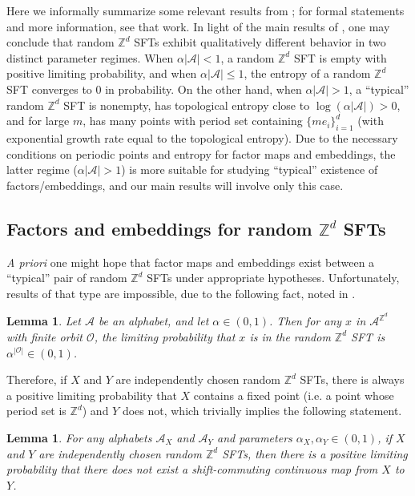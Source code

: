 \documentclass[12pt]{amsart}
\newtheorem{lemma}[theorem]{Lemma}
\theoremstyle{definition}
\begin{document}
Here we informally summarize some relevant results from \cite{McGoffPavlov}; for formal statements and more information, see that work. In light of the main results of \cite{McGoffPavlov}, one may conclude that random $\mathbb{Z}^d$ SFTs exhibit qualitatively different behavior in two distinct parameter regimes. When $\alpha |\mathcal{A}| < 1$, a random $\mathbb{Z}^d$ SFT is empty with positive limiting probability, and when $\alpha |\mathcal{A}| \leq 1$, the entropy of a random $\mathbb{Z}^d$ SFT converges to $0$ in probability. On the other hand, when $\alpha |\mathcal{A}| > 1$, a ``typical'' random $\mathbb{Z}^d$ SFT is nonempty, has topological entropy close to $\log(\alpha |\mathcal{A}|) > 0$, and for large $m$, has many points with period set containing $\{me_i\}_{i=1}^d$ (with exponential growth rate equal to the topological entropy). Due to the necessary conditions on periodic points and entropy for factor maps and embeddings, the latter regime ($\alpha |\mathcal{A}| >1$) is more suitable for studying ``typical'' existence of factors/embeddings, and our main results will involve only this case.

\subsection{Factors and embeddings for random $\mathbb{Z}^d$ SFTs} \label{Sect:MainResults}

\textit{A priori} one might hope that factor maps and embeddings exist between a ``typical'' pair of random $\mathbb{Z}^d$ SFTs under appropriate hypotheses. Unfortunately, results of that type are impossible, due to the following fact, noted in \cite{McGoffPavlov}.

\begin{lemma}\label{perlemma}
Let $\mathcal{A}$ be an alphabet, and let $\alpha \in (0,1)$. Then for any $x$ in $\mathcal{A}^{\mathbb{Z}^d}$ with finite orbit $\mathcal{O}$, the limiting probability that $x$ is in the random $\mathbb{Z}^d$ SFT is 
$\alpha^{|\mathcal{O}|} \in (0,1)$.
\end{lemma} 

Therefore, if $X$ and $Y$ are independently chosen random $\mathbb{Z}^d$ SFTs, there is always a positive limiting probability that $X$ contains a fixed point (i.e. a point whose period set is $\mathbb{Z}^d$) and $Y$ does not, which trivially implies the following statement.

\begin{lemma}
For any alphabets $\mathcal{A}_X$ and $\mathcal{A}_Y$ and parameters $\alpha_X, \alpha_Y \in (0,1)$, if $X$ and $Y$ are independently chosen random $\mathbb{Z}^d$ SFTs, then there is a positive limiting probability that there does not exist a shift-commuting continuous map from $X$ to $Y$.
\end{lemma}
\end{document}
